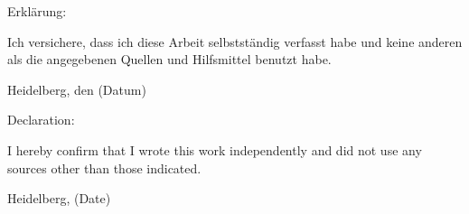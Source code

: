 \setlength{\parindent}{0em}

Erkl\"{a}rung:\par
\vspace{3\baselineskip}
Ich versichere, dass ich diese Arbeit selbstst\"{a}ndig verfasst habe und keine
anderen als die angegebenen Quellen und Hilfsmittel benutzt habe.\par
\vspace{5\baselineskip}
Heidelberg, den (Datum)\hspace{3cm}\dotfill
%
\vspace{8\baselineskip}

Declaration:\par
\vspace{3\baselineskip}
I hereby confirm that I wrote this work independently and did not use any sources other than those indicated.\par
\vspace{5\baselineskip}
Heidelberg, (Date)\hspace{3cm}\dotfill


